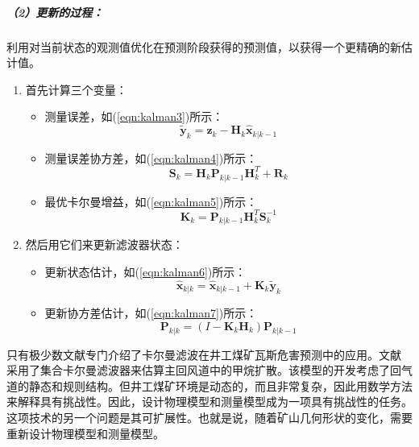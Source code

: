 \documentclass[lang=cn,a4paper,citestyle=gb7714-2015, bibstyle=gb7714-2015]{elegantpaper}
\newcommand{\mycite}[1]{\textsuperscript{\parencite{#1}}}
\begin{document}
    \subparagraph*{（2）更新的过程：}利用对当前状态的观测值优化在预测阶段获得的预测值，以获得一个更精确的新估计值。
    \begin{enumerate}[label=\alph*.]
        \item 首先计算三个变量：\begin{itemize}
            \item   测量误差，如(\ref{eqn:kalman3})所示：
            \begin{equation}{\tilde {\textbf {y}}}_{k}={\textbf {z}}_{k}-{\textbf {H}}_{k}{\hat {\textbf {x}}}_{k|k-1}
                \label{eqn:kalman3}
            \end{equation}
            \item   测量误差协方差，如(\ref{eqn:kalman4})所示：
            \begin{equation}{\textbf {S}}_{k}={\textbf {H}}_{k}{\textbf {P}}_{k|k-1}{\textbf {H}}_{k}^{T}+{\textbf {R}}_{k}
                \label{eqn:kalman4}
            \end{equation}
            \item   最优卡尔曼增益，如(\ref{eqn:kalman5})所示：
            \begin{equation}{\textbf {K}}_{k}={\textbf {P}}_{k|k-1}{\textbf {H}}_{k}^{T}{\textbf {S}}_{k}^{-1}
                \label{eqn:kalman5}
            \end{equation}
        \end{itemize}
        \item 然后用它们来更新滤波器状态： \begin{itemize}
            \item  更新状态估计，如(\ref{eqn:kalman6})所示：
            \begin{equation}{\hat {\textbf {x}}}_{k|k}={\hat {\textbf {x}}}_{k|k-1}+{\textbf {K}}_{k}{\tilde {\textbf {y}}}_{k}
                \label{eqn:kalman6}
            \end{equation}
            \item  更新协方差估计，如(\ref{eqn:kalman7})所示：
            \begin{equation}{\textbf {P}}_{k|k}=(I-{\textbf {K}}_{k}{\textbf {H}}_{k}){\textbf {P}}_{k|k-1}
                \label{eqn:kalman7}
            \end{equation}
        \end{itemize}
    \end{enumerate}

    \bigskip
    只有极少数文献专门介绍了卡尔曼滤波在井工煤矿瓦斯危害预测中的应用。文献\mycite{Wu2018} 采用了集合卡尔曼滤波器来估算主回风道中的甲烷扩散。该模型的开发考虑了回气道的静态和规则结构。但井工煤矿环境是动态的，而且非常复杂，因此用数学方法来解释具有挑战性。因此，设计物理模型和测量模型成为一项具有挑战性的任务。这项技术的另一个问题是其可扩展性。也就是说，随着矿山几何形状的变化，需要重新设计物理模型和测量模型。
\end{document}
